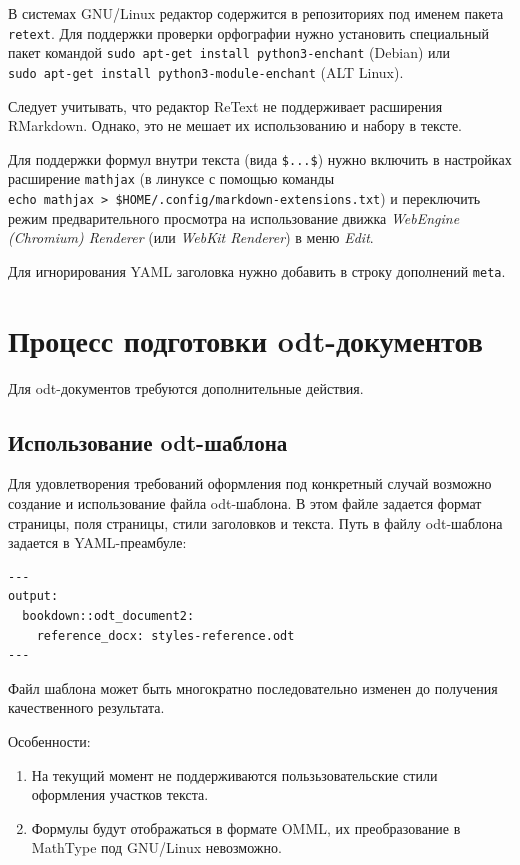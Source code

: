 \documentclass[
  a4paper,
]{book}
\providecommand{\tightlist}{%
  \setlength{\itemsep}{0pt}\setlength{\parskip}{0pt}}
\theoremstyle{definition}
\theoremstyle{definition}
\theoremstyle{definition}
\theoremstyle{definition}
\theoremstyle{remark}
\begin{document}
В системах GNU/Linux редактор содержится в репозиториях под именем пакета \texttt{retext}. Для поддержки проверки орфографии нужно установить специальный пакет командой \texttt{sudo\ apt-get\ install\ python3-enchant} (Debian) или \texttt{sudo\ apt-get\ install\ python3-module-enchant} (ALT Linux).

Следует учитывать, что редактор ReText не поддерживает расширения RMarkdown. Однако, это не мешает их использованию и набору в тексте.

Для поддержки формул внутри текста (вида \texttt{\$...\$}) нужно включить в настройках расширение \texttt{mathjax} (в линуксе с помощью команды \texttt{echo\ mathjax\ \textgreater{}\ \$HOME/.config/markdown-extensions.txt}) и переключить режим предварительного просмотра на использование движка \emph{WebEngine (Chromium) Renderer} (или \emph{WebKit Renderer}) в меню \emph{Edit}.

Для игнорирования YAML заголовка нужно добавить в строку дополнений \texttt{meta}.

\hypertarget{authoring-odt}{%
\section{Процесс подготовки odt-документов}\label{authoring-odt}}

Для odt-документов требуются дополнительные действия.

\hypertarget{authoring-odt-template}{%
\subsection{Использование odt-шаблона}\label{authoring-odt-template}}

Для удовлетворения требований оформления под конкретный случай возможно создание и использование файла odt-шаблона. В этом файле задается формат страницы, поля страницы, стили заголовков и текста. Путь в файлу odt-шаблона задается в YAML-преамбуле:

\begin{verbatim}
---
output:
  bookdown::odt_document2:
    reference_docx: styles-reference.odt
---
\end{verbatim}

Файл шаблона может быть многократно последовательно изменен до получения качественного результата.

Особенности:

\begin{enumerate}
\def\labelenumi{\arabic{enumi}.}
\tightlist
\item
  На текущий момент не поддерживаются пользьзовательские стили оформления участков текста.
\item
  Формулы будут отображаться в формате OMML, их преобразование в MathType под GNU/Linux невозможно.
\end{enumerate}
\end{document}
